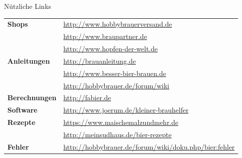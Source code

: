 \documentclass[9pt, ngerman]{beamer}
\begin{document}
\begin{frame}{Nützliche Links}
  \begin{table}
    \begin{tabular}{ll}
      \textbf{Shops} & \url{http://www.hobbybrauerversand.de}\\
      & \url{http://www.braupartner.de}\\
      & \url{http://www.hopfen-der-welt.de}\\
      \textbf{Anleitungen} & \url{http://brauanleitung.de}\\
      & \url{http://www.besser-bier-brauen.de}\\
      & \url{http://hobbybrauer.de/forum/wiki}\\
      \textbf{Berechnungen} & \url{http://fabier.de}\\
      \textbf{Software} & \url{http://www.joerum.de/kleiner-brauhelfer}\\
      \textbf{Rezepte} & \url{https://www.maischemalzundmehr.de}\\
      & \url{http://meinsudhaus.de/bier-rezepte}\\
      \textbf{Fehler} & \url{http://hobbybrauer.de/forum/wiki/doku.php/bier:fehler}
    \end{tabular}
  \end{table}
\end{frame}
\end{document}
